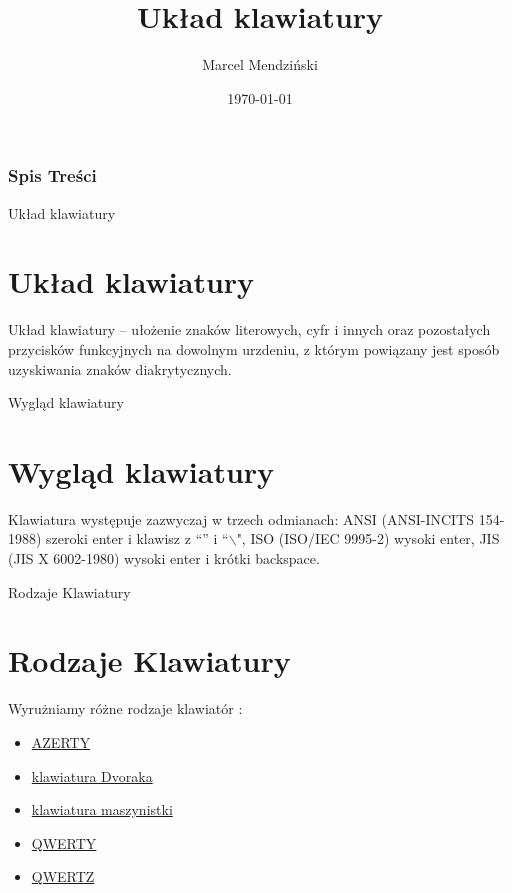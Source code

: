\documentclass[]{beamer}
\title{Układ klawiatury}
\author{Marcel Mendziński}
\date{\today}
\begin{document}
\frame
{
\maketitle
}

\begin{frame}
	\frametitle{Spis Treści}
	\tableofcontents

\end{frame}

\begin{frame}{Układ klawiatury}
	\section{Układ klawiatury}
	Układ klawiatury – ułożenie znaków literowych, cyfr i innych oraz pozostałych przycisków 	funkcyjnych na dowolnym urzdeniu, z którym powiązany jest sposób uzyskiwania znaków diakrytycznych.
\end{frame}

\begin{frame}{Wygl\k{a}d klawiatury}
	\section{Wygl\k{a}d klawiatury}
	Klawiatura występuje zazwyczaj w trzech odmianach: ANSI (ANSI-INCITS 154-1988) szeroki enter i klawisz z ``{\textbar}'' i ``$\backslash$", ISO (ISO/IEC 9995-2) wysoki enter, JIS (JIS X 6002-1980) wysoki enter i krótki backspace.
\end{frame}

\begin{frame}{Rodzaje Klawiatury}
 \section{Rodzaje Klawiatury}
		Wyrużniamy różne rodzaje klawiatór :
		\begin{itemize}
			\item \href{https://pl.wikipedia.org/wiki/AZERTY}{AZERTY}
			\item \href{https://pl.wikipedia.org/wiki/Klawiatura_Dvoraka}{klawiatura Dvoraka}
			\item \href{https://pl.wikipedia.org/wiki/Klawiatura_maszynistki}{klawiatura maszynistki}
			\item \href{https://pl.wikipedia.org/wiki/QWERTY}{QWERTY}
			\item \href{https://pl.wikipedia.org/wiki/QWERTZ}{QWERTZ}
		\end{itemize}
\end{frame}
\
\end{document}
